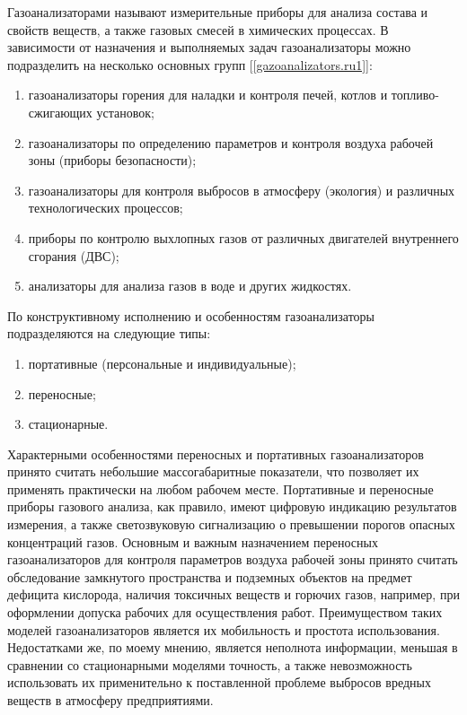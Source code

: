 \documentclass[14pt, a4paper]{extreport}
\begin{document}
	Газоанализаторами называют измерительные приборы для анализа состава и свойств веществ, а также газовых смесей в химических процессах. В зависимости от назначения и выполняемых задач газоанализаторы можно подразделить на несколько основных групп [\ref{gazoanalizators.ru1}]:
	\begin{enumerate}[label={\arabic*)}]
		\item газоанализаторы горения для наладки и контроля печей, котлов и топливо-сжигающих установок;
		\item газоанализаторы по определению параметров и контроля воздуха рабочей зоны (приборы безопасности);
		\item газоанализаторы для контроля выбросов в атмосферу (экология) и различных технологических процессов;
		\item приборы по контролю выхлопных газов от различных двигателей внутреннего сгорания (ДВС);
		\item анализаторы для анализа газов в воде и других жидкостях.
	\end{enumerate}	
	
	По конструктивному исполнению и особенностям газоанализаторы подразделяются на следующие типы:
	\begin{enumerate}[label={\arabic*)}]
		\item портативные (персональные и индивидуальные);
		\item переносные;
		\item стационарные.
	\end{enumerate}	
	
	Характерными особенностями переносных и портативных газоанализаторов принято считать небольшие массогабаритные показатели, что позволяет их применять практически на любом рабочем месте. Портативные и переносные приборы газового анализа, как правило, имеют цифровую индикацию результатов измерения, а также светозвуковую сигнализацию о превышении порогов опасных концентраций газов. Основным и важным назначением переносных газоанализаторов для контроля параметров воздуха рабочей зоны принято считать обследование замкнутого пространства и подземных объектов на предмет дефицита кислорода, наличия токсичных веществ и горючих газов, например, при оформлении допуска рабочих для осуществления работ. Преимуществом таких моделей газоанализаторов является их мобильность и простота использования. Недостатками же, по моему мнению, является неполнота информации, меньшая в сравнении со стационарными моделями точность, а также невозможность использовать их применительно к поставленной проблеме выбросов вредных веществ в атмосферу предприятиями.
	
\end{document}
